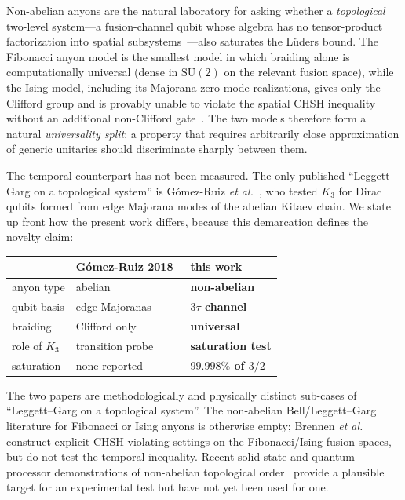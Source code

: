 \documentclass[aps,prx,reprint,amsmath,amssymb,floatfix,nofootinbib,superscriptaddress]{revtex4-2}
\begin{document}
Non-abelian anyons are the natural laboratory for asking whether a
\emph{topological} two-level system---a fusion-channel qubit whose
algebra has no tensor-product factorization into spatial
subsystems~\cite{NayakSimonStern2008}---also saturates the L\"uders
bound. The Fibonacci anyon model is the smallest model in which
braiding alone is computationally universal (dense in $\mathrm{SU}(2)$
on the relevant fusion space), while the Ising model, including its
Majorana-zero-mode realizations, gives only the Clifford group and is
provably unable to violate the spatial CHSH inequality without an
additional non-Clifford gate~\cite{ClarkeSauDasSarma2016}. The two models
therefore form a natural \emph{universality split}: a property that
requires arbitrarily close approximation of generic unitaries should
discriminate sharply between them.

The temporal counterpart has not been measured. The only published
``Leggett--Garg on a topological system'' is G\'omez-Ruiz
\emph{et al.}~\cite{GomezRuiz2018}, who tested $K_{3}$ for Dirac
qubits formed from edge Majorana modes of the abelian Kitaev chain.
We state up front how the present work differs, because this
demarcation defines the novelty claim:

\begin{center}\footnotesize
\setlength{\tabcolsep}{4pt}
\begin{tabular}{lll}
\toprule
                 & G\'omez-Ruiz 2018~\cite{GomezRuiz2018} & this work \\
\midrule
anyon type       & abelian            & \textbf{non-abelian} \\
qubit basis      & edge Majoranas     & \textbf{$3\tau$ channel} \\
braiding         & Clifford only      & \textbf{universal} \\
role of $K_{3}$  & transition probe   & \textbf{saturation test} \\
saturation       & none reported      & \textbf{$99.998\%$ of $3/2$} \\
\bottomrule
\end{tabular}
\end{center}

\noindent The two papers are methodologically and physically distinct
sub-cases of ``Leggett--Garg on a topological system''. The
non-abelian Bell/Leggett--Garg literature for Fibonacci or Ising
anyons is otherwise empty; Brennen \emph{et al.}~\cite{Brennen2009}
construct explicit CHSH-violating settings on the Fibonacci/Ising
fusion spaces, but do not test the temporal inequality. Recent
solid-state and quantum processor demonstrations of non-abelian
topological order~\cite{Andersen2023,Iqbal2024,Xu2024,Minev2025}
provide a plausible target for an experimental test but have not yet
been used for one.
\end{document}
